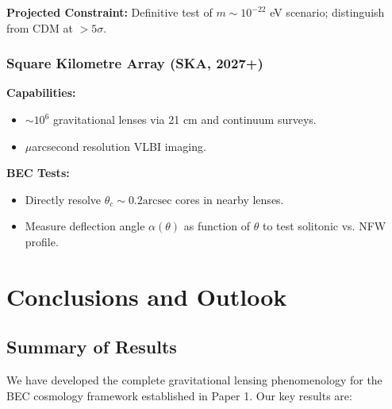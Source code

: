 \documentclass[11pt,a4paper]{article}
\newcommand{\arcsec}{\ensuremath{\text{arcsec}}}
\theoremstyle{definition}
\theoremstyle{remark}
\begin{document}
\textbf{Projected Constraint:} Definitive test of $m \sim 10^{-22}$ eV scenario; distinguish from CDM at $>5\sigma$.

\subsubsection{Square Kilometre Array (SKA, 2027+)}

\textbf{Capabilities:}
\begin{itemize}[leftmargin=*, itemsep=0.2em]
\item $\sim 10^6$ gravitational lenses via 21 cm and continuum surveys.
\item $\mu$arcsecond resolution VLBI imaging.
\end{itemize}

\textbf{BEC Tests:}
\begin{itemize}[leftmargin=*, itemsep=0.2em]
\item Directly resolve $\theta_c \sim 0.2\arcsec$ cores in nearby lenses.
\item Measure deflection angle $\alpha(\theta)$ as function of $\theta$ to test solitonic vs. NFW profile.
\end{itemize}

\section{Conclusions and Outlook}
\label{sec:conclusions}

\subsection{Summary of Results}
\label{sec:summary}

We have developed the complete gravitational lensing phenomenology for the BEC cosmology framework established in Paper 1. Our key results are:
\end{document}
